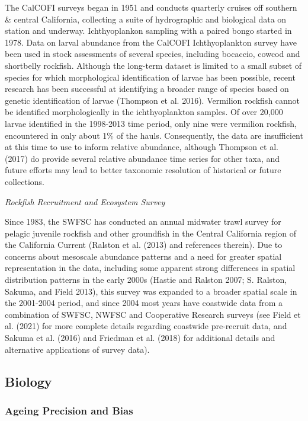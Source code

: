 \documentclass[
  english,
  a4paper,
]{article}
\begin{document}
The CalCOFI surveys began in 1951 and conducts quarterly cruises off southern \&
central California, collecting a suite of hydrographic and biological data on
station and underway. Ichthyoplankon sampling with a paired bongo started in 1978.
Data on larval abundance from the CalCOFI Ichthyoplankton survey have been used in
stock assessments of several species, including bocaccio, cowcod and shortbelly
rockfish. Although the long-term dataset is limited to a small subset of species
for which morphological identification of larvae has been possible, recent research
has been successful at identifying a broader range of species based on genetic
identification of larvae (Thompson et al. 2016).
Vermilion rockfish cannot be identified morphologically in the ichthyoplankton
samples. Of over 20,000 larvae identified in the 1998-2013 time period, only nine
were vermilion rockfish, encountered in only about 1\% of the hauls. Consequently,
the data are insufficient at this time to use to inform relative abundance, although Thompson et al. (2017) do provide several relative abundance time series for other taxa, and
future efforts may lead to better taxonomic resolution of historical or future collections.

\emph{Rockfish Recruitment and Ecosystem Survey}

Since 1983, the SWFSC has conducted an annual midwater trawl survey for pelagic
juvenile rockfish and other groundfish in the Central California region of the
California Current (Ralston et al. (2013) and references therein). Due to concerns
about mesoscale abundance patterns and a need for greater spatial representation
in the data, including some apparent strong differences in spatial distribution
patterns in the early 2000s (Hastie and Ralston 2007; S. Ralston, Sakuma, and Field 2013), this survey was expanded
to a broader spatial scale in the 2001-2004 period, and since 2004 most years have
coastwide data from a combination of SWFSC, NWFSC and Cooperative Research surveys
(see Field et al. (2021) for more complete details regarding coastwide
pre-recruit data, and Sakuma et al. (2016) and Friedman et al. (2018)
for additional details and alternative applications of survey data).

\hypertarget{biology}{%
\subsection{Biology}\label{biology}}

\hypertarget{ageing-precision-and-bias}{%
\subsubsection{Ageing Precision and Bias}\label{ageing-precision-and-bias}}
\end{document}
